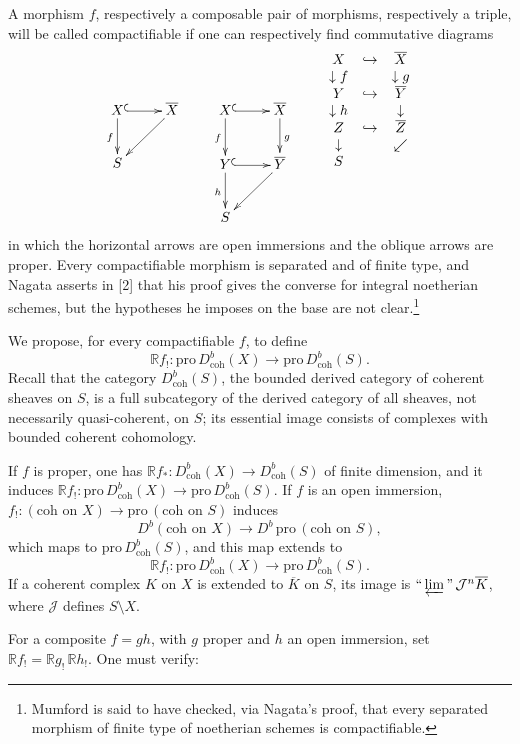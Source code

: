 \documentclass[12pt]{amsart}
\theoremstyle{plain}
\theoremstyle{definition}
\newcommand{\Pro}{\text{pro}\,}
\newcommand{\coh}{\text{coh}}
\newcommand{\cJ}{\mathcal{J}}
\newcommand{\cDb}{D^{b}}
\newcommand{\bR}{\mathbb{R}}
\begin{document}
A morphism $f$, respectively a composable pair of morphisms, respectively a triple, will be called compactifiable if one can respectively find commutative diagrams
\[
\xymatrix{
X \ar@{^{(}->}[r] \ar[d]_f & \overline X \ar[dl] \\
S &
}
\qquad
\xymatrix{
X \ar@{^{(}->}[r] \ar[d]_f & \overline X \ar[d]^g \\
Y \ar@{^{(}->}[r] \ar[d]_h & \overline Y \ar[dl] \\
S &
}
\qquad
\begin{array}{ccc}
X & \hookrightarrow & \overline X \\
\downarrow f && \downarrow g \\
Y & \hookrightarrow & \overline Y \\
\downarrow h && \downarrow \\
Z & \hookrightarrow & \overline Z \\
\downarrow && \swarrow \\
S &&
\end{array}
\]
in which the horizontal arrows are open immersions and the oblique arrows are proper. Every compactifiable morphism is separated and of finite type, and Nagata asserts in [2] that his proof gives the converse for integral noetherian schemes, but the hypotheses he imposes on the base are not clear.\footnote{Mumford is said to have checked, via Nagata's proof, that every separated morphism of finite type of noetherian schemes is compactifiable.}

We propose, for every compactifiable $f$, to define
\[
\bR f_!:\Pro\cDb_{\coh}(X)\to\Pro\cDb_{\coh}(S).
\]
Recall that the category $\cDb_{\coh}(S)$, the bounded derived category of coherent sheaves on $S$, is a full subcategory of the derived category of all sheaves, not necessarily quasi-coherent, on $S$; its essential image consists of complexes with bounded coherent cohomology.

If $f$ is proper, one has $\bR f_*:\cDb_{\coh}(X)\to\cDb_{\coh}(S)$ of finite dimension, and it induces $\bR f_!:\Pro\cDb_{\coh}(X)\to\Pro\cDb_{\coh}(S)$. If $f$ is an open immersion, $f_!:(\text{coh on }X)\to\Pro(\text{coh on }S)$ induces
\[
\cDb(\text{coh on }X)\to\cDb\,\Pro(\text{coh on }S),
\]
which maps to $\Pro\cDb_{\coh}(S)$, and this map extends to
\[
\bR f_!:\Pro\cDb_{\coh}(X)\to\Pro\cDb_{\coh}(S).
\]
If a coherent complex $K$ on $X$ is extended to $\overline K$ on $S$, its image is $\text{``}\varprojlim\text{''}\,\cJ^n\overline K$, where $\cJ$ defines $S\setminus X$.

For a composite $f=gh$, with $g$ proper and $h$ an open immersion, set $\bR f_!=\bR g_!\,\bR h_!$. One must verify:
\end{document}
